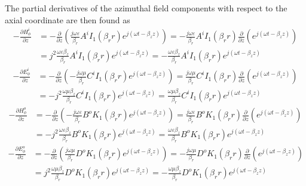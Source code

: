 The partial derivatives of the azimuthal field components with respect to the axial coordinate are then found as
\begin{equation}
	\begin{split}
		-\frac{\partial H_\phi^i}{\partial z} &= -\frac{\partial}{\partial z} \left( \frac{j \omega \varepsilon}{\beta_r} A^i I_1(\beta_r r) e^{j(\omega t - \beta_z z)} \right) = -\frac{j \omega \varepsilon}{\beta_r} A^i I_1(\beta_r r) \frac{\partial}{\partial z} \left( e^{j(\omega t - \beta_z z)} \right) \\
		&= j^2 \frac{\omega \varepsilon \beta_z}{\beta_r} A^i I_1(\beta_r r) e^{j(\omega t - \beta_z z)} = -\frac{\omega \varepsilon \beta_z}{\beta_r} A^i I_1(\beta_r r) e^{j(\omega t - \beta_z z)}
	\end{split}
	\label{eq:dHz_i}
\end{equation}
\begin{equation}
	\begin{split}
		-\frac{\partial E_\phi^i}{\partial z} &= -\frac{\partial}{\partial z} \left( -\frac{j \omega \mu}{\beta_r} C^i I_1(\beta_r r) e^{j(\omega t - \beta_z z)} \right) = \frac{j \omega \mu}{\beta_r} C^i I_1(\beta_r r) \frac{\partial}{\partial z} \left( e^{j(\omega t - \beta_z z)} \right) \\
		&= -j^2 \frac{\omega \mu \beta_z}{\beta_r} C^i I_1(\beta_r r) e^{j(\omega t - \beta_z z)} = \frac{\omega \mu \beta_z}{\beta_r} C^i I_1(\beta_r r) e^{j(\omega t - \beta_z z)}
	\end{split}
	\label{eq:dEz_i}
\end{equation}
\begin{equation}
	\begin{split}
		-\frac{\partial H_\phi^o}{\partial z} &= -\frac{\partial}{\partial z} \left( -\frac{j \omega \varepsilon}{\beta_r} B^o K_1(\beta_r r) e^{j(\omega t - \beta_z z)} \right) = \frac{j \omega \varepsilon}{\beta_r} B^o K_1(\beta_r r) \frac{\partial}{\partial z} \left( e^{j(\omega t - \beta_z z)} \right) \\
		&= -j^2 \frac{\omega \varepsilon \beta_z}{\beta_r} B^o K_1(\beta_r r) e^{j(\omega t - \beta_z z)} = \frac{\omega \varepsilon \beta_z}{\beta_r} B^o K_1(\beta_r r) e^{j(\omega t - \beta_z z)}
	\end{split}
	\label{eq:dHz_o}
\end{equation}
\begin{equation}
	\begin{split}
		-\frac{\partial E_\phi^o}{\partial z} &= -\frac{\partial}{\partial z} \left( \frac{j \omega \mu}{\beta_r} D^o K_1(\beta_r r) e^{j(\omega t - \beta_z z)} \right) = -\frac{j \omega \mu}{\beta_r} D^o K_1(\beta_r r) \frac{\partial}{\partial z} \left( e^{j(\omega t - \beta_z z)} \right) \\
		&= j^2 \frac{\omega \mu \beta_z}{\beta_r} D^o K_1(\beta_r r) e^{j(\omega t - \beta_z z)} = -\frac{\omega \mu \beta_z}{\beta_r} D^o K_1(\beta_r r) e^{j(\omega t - \beta_z z)}
	\end{split}
	\label{eq:dEz_o}
\end{equation}
